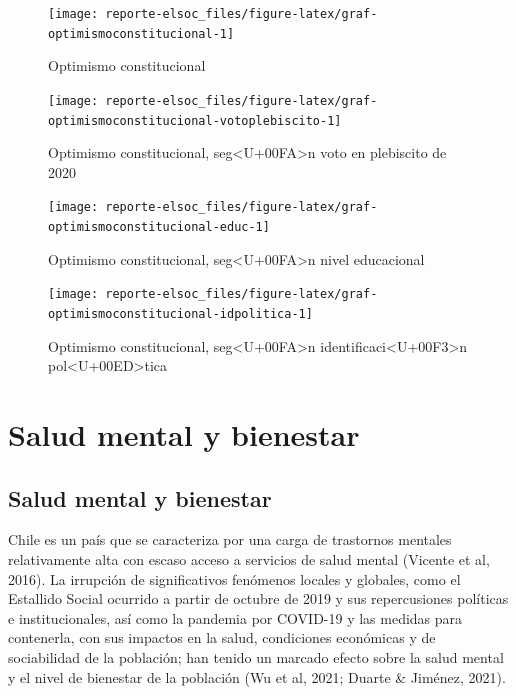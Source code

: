 \documentclass[
  12pt,
]{book}
\begin{document}
\begin{figure}

{\centering \texttt{[image: reporte-elsoc\_files/figure-latex/graf-optimismoconstitucional-1]} 

}

\caption{Optimismo constitucional}\label{fig:graf-optimismoconstitucional}
\end{figure}

\begin{figure}

{\centering \texttt{[image: reporte-elsoc\_files/figure-latex/graf-optimismoconstitucional-votoplebiscito-1]} 

}

\caption{Optimismo constitucional, seg<U+00FA>n voto en plebiscito de 2020}\label{fig:graf-optimismoconstitucional-votoplebiscito}
\end{figure}

\begin{figure}

{\centering \texttt{[image: reporte-elsoc\_files/figure-latex/graf-optimismoconstitucional-educ-1]} 

}

\caption{Optimismo constitucional, seg<U+00FA>n nivel educacional}\label{fig:graf-optimismoconstitucional-educ}
\end{figure}

\begin{figure}

{\centering \texttt{[image: reporte-elsoc\_files/figure-latex/graf-optimismoconstitucional-idpolitica-1]} 

}

\caption{Optimismo constitucional, seg<U+00FA>n identificaci<U+00F3>n pol<U+00ED>tica}\label{fig:graf-optimismoconstitucional-idpolitica}
\end{figure}

\hypertarget{salud-mental-y-bienestar}{%
\chapter{Salud mental y bienestar}\label{salud-mental-y-bienestar}}

\hypertarget{salud-mental-y-bienestar-1}{%
\section{Salud mental y bienestar}\label{salud-mental-y-bienestar-1}}

Chile es un país que se caracteriza por una carga de trastornos mentales relativamente alta con escaso acceso a servicios de salud mental (Vicente et al, 2016). La irrupción de significativos fenómenos locales y globales, como el Estallido Social ocurrido a partir de octubre de 2019 y sus repercusiones políticas e institucionales, así como la pandemia por COVID-19 y las medidas para contenerla, con sus impactos en la salud, condiciones económicas y de sociabilidad de la población; han tenido un marcado efecto sobre la salud mental y el nivel de bienestar de la población (Wu et al, 2021; Duarte \& Jiménez, 2021).
\end{document}
